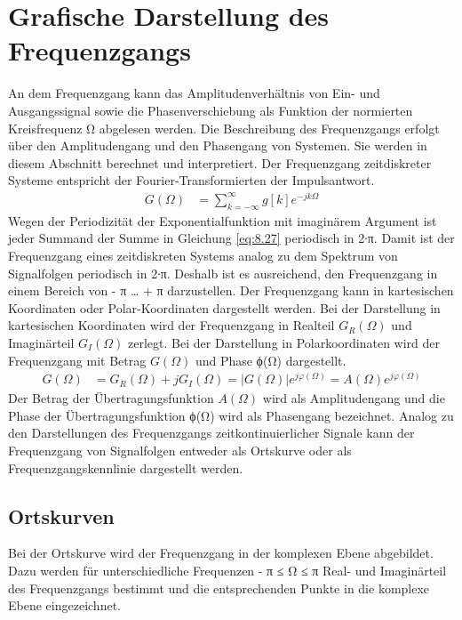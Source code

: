 \section{Grafische Darstellung des Frequenzgangs}\label{sec:8.2}

An dem Frequenzgang kann das Amplitudenverhältnis von Ein- und Ausgangssignal sowie die Phasenverschiebung als Funktion der normierten Kreisfrequenz Ω abgelesen werden. Die Beschreibung des Frequenzgangs erfolgt über den Amplitudengang und den Phasengang von Systemen. Sie werden in diesem Abschnitt berechnet und interpretiert. Der Frequenzgang zeitdiskreter Systeme entspricht der Fourier-Transformierten der Impulsantwort.
\begin{align}
G(\Omega) &= \sum\limits_{k = - \infty}^{\infty}{g[ k]  e^{- j  k  \Omega}} \label{eq:8.27}
\end{align}
Wegen der Periodizität der Exponentialfunktion mit imaginärem Argument ist jeder Summand der Summe in Gleichung \eqref{eq:8.27} periodisch in 2∙π. Damit ist der Frequenzgang eines zeitdiskreten Systems analog zu dem Spektrum von Signalfolgen periodisch in 2∙π. Deshalb ist es ausreichend, den Frequenzgang in einem Bereich von - π \ldots{} + π darzustellen. Der Frequenzgang kann in kartesischen Koordinaten oder Polar-Koordinaten dargestellt werden. Bei der Darstellung in kartesischen Koordinaten wird der Frequenzgang in Realteil \(G_{R}(Ω)\) und Imaginärteil \(G_{I}(Ω)\) zerlegt. Bei der Darstellung in Polarkoordinaten wird der Frequenzgang mit Betrag \textbar \(G(Ω)\)\textbar{} und Phase ϕ(Ω) dargestellt.
\begin{align}
G(\Omega) &= G_{R}(\Omega) + j  G_{I}(\Omega) = \left| G(\Omega) \right|  e^{j  \varphi(\Omega)} = A(\Omega)  e^{j  \varphi(\Omega)} \label{eq:8.28}
\end{align}
Der Betrag der Übertragungsfunktion \(A(Ω)\) wird als Amplitudengang und die Phase der Übertragungsfunktion ϕ(Ω) wird als Phasengang bezeichnet. Analog zu den Darstellungen des Frequenzgangs zeitkontinuierlicher Signale kann der Frequenzgang von Signalfolgen entweder als Ortskurve oder als Frequenzgangskennlinie dargestellt werden.

\subsection{Ortskurven}\label{sec:ortskurven}

Bei der Ortskurve wird der Frequenzgang in der komplexen Ebene abgebildet. Dazu werden für unterschiedliche Frequenzen - π ≤ Ω ≤ π Real- und Imaginärteil des Frequenzgangs bestimmt und die entsprechenden Punkte in die komplexe Ebene eingezeichnet.


